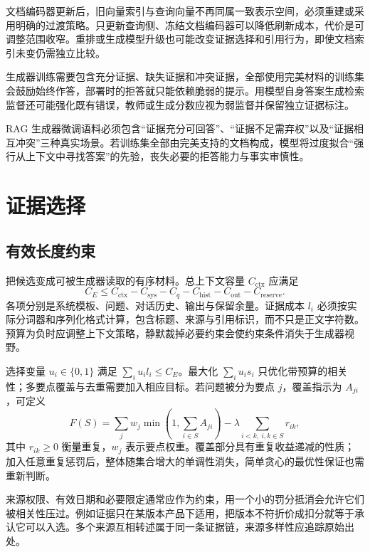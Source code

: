 \documentclass[../textbook.tex]{subfiles}
\begin{document}
文档编码器更新后，旧向量索引与查询向量不再同属一致表示空间，必须重建或采用明确的过渡策略。只更新查询侧、冻结文档编码器可以降低刷新成本，代价是可调整范围收窄。重排或生成模型升级也可能改变证据选择和引用行为，即使文档索引未变仍需独立比较。

生成器训练需要包含充分证据、缺失证据和冲突证据，全部使用完美材料的训练集会鼓励始终作答，部署时的拒答就只能依赖脆弱的提示。用模型自身答案生成检索监督还可能强化既有错误，教师或生成分数应视为弱监督并保留独立证据标注。

\begin{tip}[拒答与鲁棒性训练中的负样本配比]
RAG 生成器微调语料必须包含“证据充分可回答”、“证据不足需弃权”以及“证据相互冲突”三种真实场景。若训练集全部由完美支持的文档构成，模型将过度拟合“强行从上下文中寻找答案”的先验，丧失必要的拒答能力与事实审慎性。
\end{tip}

\section{证据选择}

\subsection{有效长度约束}
把候选变成可被生成器读取的有序材料。总上下文容量 $C_{\mathrm{ctx}}$ 应满足
\begin{equation}
 C_E\leq C_{\mathrm{ctx}}-C_{\mathrm{sys}}-C_q-C_{\mathrm{hist}}-C_{\mathrm{out}}-C_{\mathrm{reserve}}.
\end{equation}
各项分别是系统模板、问题、对话历史、输出与保留余量。证据成本 $l_i$ 必须按实际分词器和序列化格式计算，包含标题、来源与引用标识，而不只是正文字符数。预算为负时应调整上下文策略，静默裁掉必要约束会使约束条件消失于生成器视野。

选择变量 $u_i\in\{0,1\}$ 满足 $\sum_i u_il_i\leq C_E$。最大化 $\sum_i u_i s_i$ 只优化带预算的相关性；多要点覆盖与去重需要加入相应目标。若问题被分为要点 $j$，覆盖指示为 $A_{ji}$，可定义
\begin{equation}
 F(S)=\sum_j w_j\min\left(1,\sum_{i\in S}A_{ji}\right)
 -\lambda\sum_{i<k,\ i,k\in S}r_{ik},
\end{equation}
其中 $r_{ik}\geq0$ 衡量重复，$w_j$ 表示要点权重。覆盖部分具有重复收益递减的性质；加入任意重复惩罚后，整体随集合增大的单调性消失，简单贪心的最优性保证也需重新判断。

来源权限、有效日期和必要限定通常应作为约束，用一个小的罚分抵消会允许它们被相关性压过。例如证据只在某版本产品下适用，把版本不符折价成扣分就等于承认它可以入选。多个来源互相转述属于同一条证据链，来源多样性应追踪原始出处。
\end{document}
